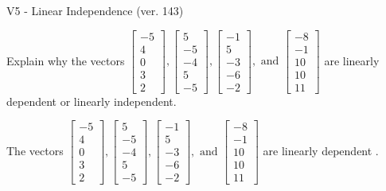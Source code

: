 \begin{exercise}
  \begin{exerciseTitle}V5 - Linear Independence (ver. 143)\end{exerciseTitle}
  \begin{exerciseStatement}
    Explain why the vectors \(\left[\begin{array}{r}
-5 \\
4 \\
0 \\
3 \\
2
\end{array}\right] , \left[\begin{array}{r}
5 \\
-5 \\
-4 \\
5 \\
-5
\end{array}\right] , \left[\begin{array}{r}
-1 \\
5 \\
-3 \\
-6 \\
-2
\end{array}\right] , \text{ and } \left[\begin{array}{r}
-8 \\
-1 \\
10 \\
10 \\
11
\end{array}\right]\) are linearly dependent or linearly independent.	


  \end{exerciseStatement}
  \begin{exerciseAnswer}
   The vectors \(\left[\begin{array}{r}
-5 \\
4 \\
0 \\
3 \\
2
\end{array}\right] , \left[\begin{array}{r}
5 \\
-5 \\
-4 \\
5 \\
-5
\end{array}\right] , \left[\begin{array}{r}
-1 \\
5 \\
-3 \\
-6 \\
-2
\end{array}\right] , \text{ and } \left[\begin{array}{r}
-8 \\
-1 \\
10 \\
10 \\
11
\end{array}\right]\) are 
  	 linearly dependent  .
  


  \end{exerciseAnswer}
\end{exercise}